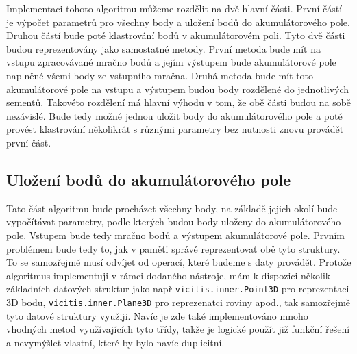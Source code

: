 \documentclass[11pt,twoside,a4paper]{book}
\begin{document}
Implementaci tohoto algoritmu můžeme rozdělit na dvě hlavní části. První částí je výpočet parametrů pro všechny body a uložení bodů do akumulátorového pole. Druhou částí bude poté klastrování bodů v akumulátorovém poli. Tyto dvě části budou reprezentovány jako samostatné metody. První metoda bude mít na vstupu zpracovávané mračno bodů a jejím výstupem bude akumulátorové pole naplněné všemi body ze vstupního mračna. Druhá metoda bude mít toto akumulátorové pole na vstupu a výstupem budou body rozdělené do jednotlivých sementů. Takovéto rozdělení má hlavní výhodu v tom, že obě části budou na sobě nezávislé. Bude tedy možné jednou uložit body do akumulátorového pole a poté provést klastrování několikrát s různými parametry bez nutnosti znovu provádět první část.

\subsection{Uložení bodů do akumulátorového pole}

Tato část algoritmu bude procházet všechny body, na základě jejich okolí bude vypočítávat parametry, podle kterých budou body uloženy do akumulátorového pole. Vstupem bude tedy mračno bodů a výstupem akumulátorové pole. Prvním problémem bude tedy to, jak v paměti správě reprezentovat obě tyto struktury. To se samozřejmě musí odvíjet od operací, které budeme s daty provádět. Protože algoritmus implementuji v rámci dodaného nástroje, mám k dispozici několik základních datových struktur jako např \verb|vicitis.inner.Point3D| pro reprezentaci 3D bodu, \verb|vicitis.inner.Plane3D| pro reprezenatci roviny apod., tak samozřejmě tyto datové struktury využiji. Navíc je zde také implementováno mnoho vhodných metod využívajících tyto třídy, takže je logické použít již funkční řešení a nevymýšlet vlastní, které by bylo navíc duplicitní.
\end{document}
